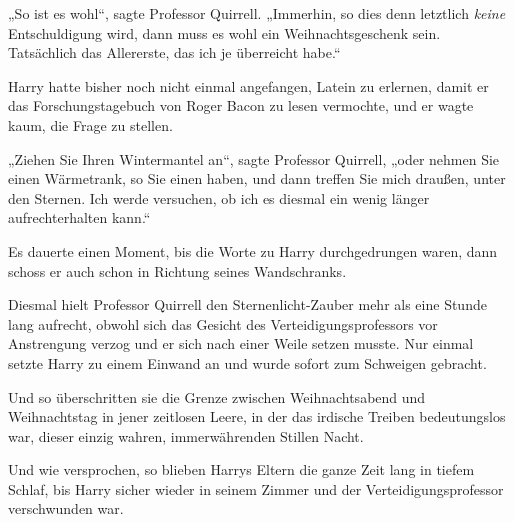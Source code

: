 „So ist es wohl“, sagte Professor Quirrell.
„Immerhin, so dies denn letztlich \emph{keine} Entschuldigung wird, dann muss es wohl ein Weihnachtsgeschenk sein. Tatsächlich das Allererste, das ich je überreicht habe.“

Harry hatte bisher noch nicht einmal angefangen, Latein zu erlernen, damit er das Forschungstagebuch von Roger Bacon zu lesen vermochte, und er wagte kaum, die Frage zu stellen.

„Ziehen Sie Ihren Wintermantel an“, sagte Professor Quirrell, „oder nehmen Sie einen Wärmetrank, so Sie einen haben, und dann treffen Sie mich draußen, unter den Sternen. Ich werde versuchen, ob ich es diesmal ein wenig länger aufrechterhalten kann.“

Es dauerte einen Moment, bis die Worte zu Harry durchgedrungen waren, dann schoss er auch schon in Richtung seines Wandschranks.

Diesmal hielt Professor Quirrell den Sternenlicht-Zauber mehr als eine Stunde lang aufrecht, obwohl sich das Gesicht des Verteidigungsprofessors vor Anstrengung verzog und er sich nach einer Weile setzen musste. Nur einmal setzte Harry zu einem Einwand an und wurde sofort zum Schweigen gebracht.

Und so überschritten sie die Grenze zwischen Weihnachtsabend und Weihnachtstag in jener zeitlosen Leere, in der das irdische Treiben bedeutungslos war, dieser einzig wahren, immerwährenden Stillen Nacht.

Und wie versprochen, so blieben Harrys Eltern die ganze Zeit lang in tiefem Schlaf, bis Harry sicher wieder in seinem Zimmer und der Verteidigungsprofessor verschwunden war.